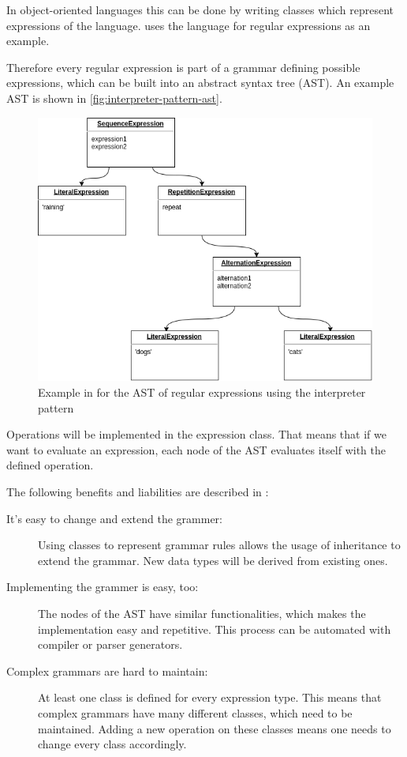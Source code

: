 \documentclass{llncs}
\begin{document}
In object-oriented languages this can be done by writing classes which represent expressions of the language. \cite{GHJV94} uses the language for regular expressions as an example.

Therefore every regular expression is part of a grammar defining possible expressions, which can be built into  an abstract syntax tree (AST). An example AST is shown in \autoref{fig:interpreter-pattern-ast}.

\begin{figure}[h]
	\centering
	\includegraphics[width=\textwidth]{img/Interpreter-Pattern-AST-Example}
	\caption{Example in \cite{GHJV94} for the AST of regular expressions using the interpreter pattern }
	\label{fig:interpreter-pattern-ast}
\end{figure} 

Operations will be implemented in the expression class. That means that if we want to evaluate an expression, each node of the AST evaluates itself with the defined operation.

The following benefits and liabilities are described in \cite{GHJV94}:

\begin{description}
	\item[It's easy to change and extend the grammer:] Using classes to represent grammar rules allows the usage of inheritance to extend the grammar. New data types will be derived from existing ones.
	
	\item[Implementing the grammer is easy, too:] The nodes of the AST have similar functionalities, which makes the implementation easy and repetitive. This process can be automated with compiler or parser generators.
	
	\item[Complex grammars are hard to maintain:] At least one class is defined for every expression type. This means that complex grammars have many different classes, which need to be maintained. Adding a new operation on these classes means one needs to change every class accordingly.
\end{description}
\end{document}
